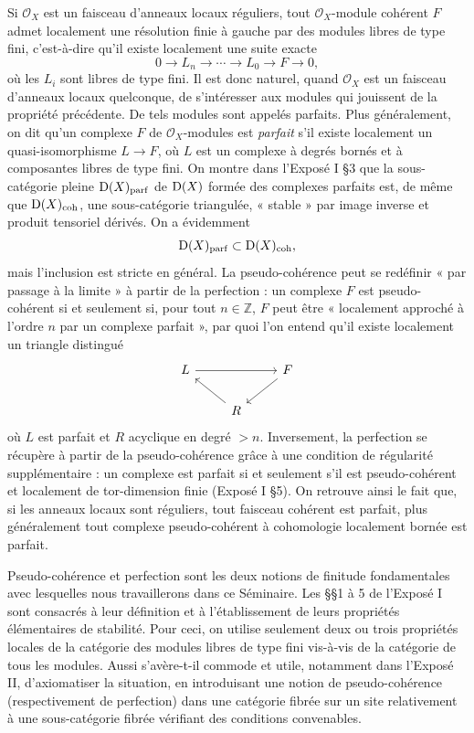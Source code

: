 \documentclass[11pt]{article}
\begin{document}
Si \(\mathcal O_X\) est un faisceau d'anneaux locaux réguliers, tout \(\mathcal O_X\)-module cohérent \(F\) admet localement une résolution finie à gauche par des modules libres de type fini, c'est-à-dire qu'il existe localement une suite exacte
\[
  0\longrightarrow L_n\longrightarrow \cdots \longrightarrow L_0\longrightarrow F\longrightarrow 0,
\]
où les \(L_i\) sont libres de type fini. Il est donc naturel, quand \(\mathcal O_X\) est un faisceau d'anneaux locaux quelconque, de s'intéresser aux modules qui jouissent de la propriété précédente. De tels modules sont appelés parfaits. Plus généralement, on dit qu'un complexe \(F\) de \(\mathcal O_X\)-modules est \emph{parfait} s'il existe localement un quasi-isomorphisme \(L\to F\), où \(L\) est un complexe à degrés bornés et à composantes libres de type fini. On montre dans l'Exposé I §3 que la sous-catégorie pleine \(\mathrm D(X)_{\mathrm{parf}}\) de \(\mathrm D(X)\) formée des complexes parfaits est, de même que \(\mathrm D(X)_{\mathrm{coh}}\), une sous-catégorie triangulée, « stable » par image inverse et produit tensoriel dérivés. On a évidemment
\[
  \mathrm D(X)_{\mathrm{parf}}\subset\mathrm D(X)_{\mathrm{coh}},
\]
mais l'inclusion est stricte en général. La pseudo-cohérence peut se redéfinir « par passage à la limite » à partir de la perfection : un complexe \(F\) est pseudo-cohérent si et seulement si, pour tout \(n\in\mathbb Z\), \(F\) peut être « localement approché à l'ordre \(n\) par un complexe parfait », par quoi l'on entend qu'il existe localement un triangle distingué
\[
\begin{tikzcd}
L \arrow[rr] && F \arrow[dl]\\
& R \arrow[ul] &
\end{tikzcd}
\]
où \(L\) est parfait et \(R\) acyclique en degré \(>n\). Inversement, la perfection se récupère à partir de la pseudo-cohérence grâce à une condition de régularité supplémentaire : un complexe est parfait si et seulement s'il est pseudo-cohérent et localement de tor-dimension finie (Exposé I §5). On retrouve ainsi le fait que, si les anneaux locaux sont réguliers, tout faisceau cohérent est parfait, plus généralement tout complexe pseudo-cohérent à cohomologie localement bornée est parfait.

Pseudo-cohérence et perfection sont les deux notions de finitude fondamentales avec lesquelles nous travaillerons dans ce Séminaire. Les §§1 à 5 de l'Exposé I sont consacrés à leur définition et à l'établissement de leurs propriétés élémentaires de stabilité. Pour ceci, on utilise seulement deux ou trois propriétés locales de la catégorie des modules libres de type fini vis-à-vis de la catégorie de tous les modules. Aussi s'avère-t-il commode et utile, notamment dans l'Exposé II, d'axiomatiser la situation, en introduisant une notion de pseudo-cohérence (respectivement de perfection) dans une catégorie fibrée sur un site relativement à une sous-catégorie fibrée vérifiant des conditions convenables.
\end{document}
